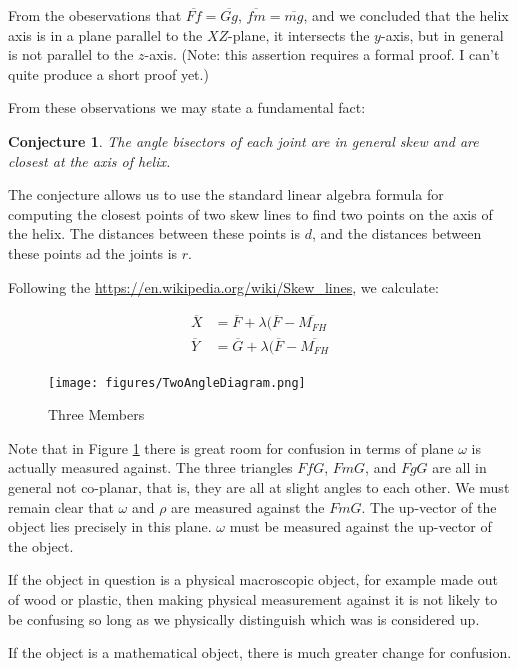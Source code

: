\documentclass[11pt]{article}
\newtheorem{conjecture}{Conjecture}
\begin{document}
From the obeservations that $\overline{Ff} = \overline{Gg}$,
$\overline{fm} = \overline{mg} $, and
 we concluded that the helix axis is in a plane
parallel to the $XZ$-plane, it intersects the $y$-axis, but in general is
not parallel to the $z$-axis. (Note: this assertion requires a formal proof. I can't quite produce a short proof yet.)

From these observations we may state a fundamental fact:

\begin{conjecture}
  The angle bisectors of each joint are in general skew and are closest
  at the axis of helix.
\end{conjecture}

The conjecture allows us to use the standard linear algebra formula for
computing the closest points of two skew lines to find two points on the
axis of the helix. The distances between these points is $d$, and the
distances between these points ad the joints is $r$.

Following the \url{https://en.wikipedia.org/wiki/Skew_lines}, we calculate:

\begin{align}
  \overline{X} &= \overline{F} + \lambda(\overline{F} - \overline{M_{FH}} \\
  \overline{Y} &= \overline{G} + \lambda(\overline{F} - \overline{M_{FH}}  
\end{align}

\begin{figure}
     \centering
     \texttt{[image: figures/TwoAngleDiagram.png]}
     \caption{Three Members}
  \label{fig:threemembersdiagram}
\end{figure}

Note that in Figure \ref{fig:threemembersdiagram} there is great
room for confusion in terms of plane $\omega$ is actually
measured against. The three triangles $FfG$, $FmG$, and $FgG$
are all in general not co-planar, that is, they are all at
slight angles to each other.  We must remain clear that $\omega$
and $\rho$ are measured against the $FmG$. The up-vector
of the object lies precisely in this plane. $\omega$ must
be measured against the up-vector of the object.

If the object in question is a physical macroscopic object,
for example made out of wood or plastic, then making
physical measurement against it is not likely to be confusing
so long as we physically distinguish which was is considered
up.

If the object is a mathematical object, there is much
greater change for confusion.
\end{document}
